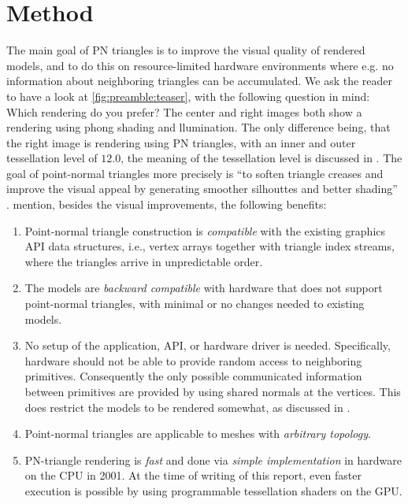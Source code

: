 
\section{Method}
\label{s:method}
The main goal of PN triangles is to improve the visual quality of rendered models, and to do this on resource-limited hardware environments where e.g. no information about neighboring triangles can be accumulated. We ask the reader to have a look at \cref{fig:preamble:teaser}, with the following question in mind: Which rendering do you prefer? The center and right images both show a rendering using phong shading and llumination. The only difference being, that the right image is rendering using PN triangles, with an inner and outer tessellation level of $12.0$, the meaning of the tessellation level is discussed in . The goal of point-normal triangles more precisely is ``to soften triangle creases and improve the visual appeal by generating smoother silhouttes and better shading'' \cite{vlachos2001curved}. \citeauthor{vlachos2001curved} mention, besides the visual improvements, the following benefits:

\begin{enumerate}[label=(\roman*)]
 	\item 
 		Point-normal triangle construction is \textit{compatible} with the existing graphics API data structures, i.e., vertex arrays together with triangle index streams, where the triangles arrive in unpredictable order.
 	\item 
 		The models are \textit{backward compatible} with hardware that does not support point-normal triangles, with minimal or no changes needed to existing models.
 	\item 
 		No setup of the application, API, or hardware driver is needed. Specifically, hardware should not be able to provide random access to neighboring primitives. Consequently the only possible communicated information between primitives are provided by using shared normals at the vertices. This does restrict the models to be rendered somewhat, as discussed in .
 	\item 
 		Point-normal triangles are applicable to meshes with \textit{arbitrary topology}.
 	\item 
 		PN-triangle rendering is \textit{fast} and done via \textit{simple implementation} in hardware on the CPU in 2001. At the time of writing of this report, even faster execution is possible by using programmable tessellation shaders on the GPU.
 \end{enumerate} 

